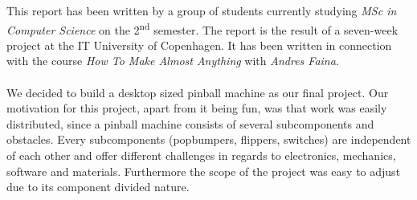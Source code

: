 This report has been written by a group of students currently studying \textit{MSc in Computer Science} on the 2\textsuperscript{nd} semester. The report is the result of a seven-week project at the IT University of Copenhagen.
It has been written in connection with the course \textit{How To Make Almost Anything} with \textit{Andres Faina}.\\\\
We decided to build a desktop sized pinball machine as our final project. Our motivation for this project, apart from it being fun, was that work was easily distributed, since a pinball machine consists of several subcomponents and obstacles. Every subcomponents (popbumpers, flippers, switches) are independent of each other and offer different challenges in regards to electronics, mechanics, software and materials. Furthermore the scope of the project was easy to adjust due to its component divided nature.